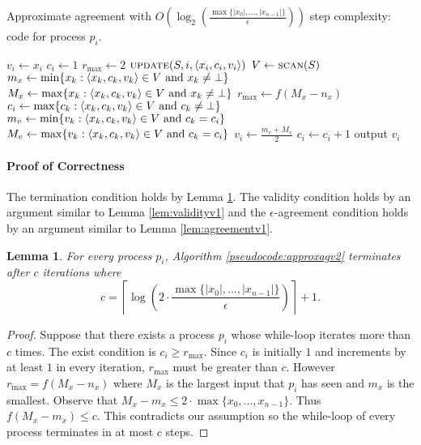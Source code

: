 \documentclass[11pt]{article}
\newcommand\updateF{\textsc{update}}
\newcommand\scanF{\textsc{scan}}
\newtheorem{lemma}[theorem]{Lemma}
\DeclarePairedDelimiter\anglebrac{\langle}{\rangle}
\begin{document}
\begin{algorithm}
	\caption{Approximate agreement with $O\left(\log_2\left(\frac{\max\{|x_0|, ..., |x_{n-1}|\}}{\epsilon}\right)\right)$ step complexity: code for process $p_i$.}
    \label{pseudocode:approxagv2}
    \begin{algorithmic}[1]
	\State $v_i \leftarrow x_i$
	\State $c_i \leftarrow 1$
	\State $r_{\max} \leftarrow 2$
		\State $\updateF(S, i, \anglebrac{x_i, c_i, v_i})$
		\State $V \leftarrow \scanF(S)$
		\State $m_x \leftarrow \min\{x_k: \anglebrac{x_k, c_k, v_k} \in V \mbox{ and } x_k \neq \bot\}$
		\State $M_x \leftarrow \max\{x_k: \anglebrac{x_k, c_k, v_k} \in V \mbox{ and } x_k \neq \bot\}$
		\State $r_{\max} \leftarrow f(M_x-n_x)$
		\State $c_i \leftarrow \max\{c_k: \anglebrac{x_k, c_k, v_k} \in V \mbox{ and } c_k \neq \bot\}$
		\State $m_v \leftarrow \min\{v_k: \anglebrac{x_k, c_k, v_k} \in V \mbox{ and } c_k = c_i\}$
		\State $M_v \leftarrow \max\{v_k: \anglebrac{x_k, c_k, v_k} \in V \mbox{ and } c_k = c_i\}$
		\State $v_i \leftarrow \frac{m_v + M_v}{2}$
		\State $c_i \leftarrow c_i + 1$
	\EndWhile
	\State output $v_i$
	\end{algorithmic}
\end{algorithm}

\paragraph{Proof of Correctness}
The termination condition holds by Lemma \ref{lem:terminationv2}. The validity condition holds by an argument similar to Lemma \ref{lem:validityv1} and the $\epsilon$-agreement condition holds by an argument similar to Lemma \ref{lem:agreementv1}.

\begin{lemma}
\label{lem:terminationv2}
For every process $p_i$, Algorithm \ref{pseudocode:approxagv2} terminates after $c$ iterations where 
\[c = \left\lceil\log\left(2\cdot\frac{\max\{|x_0|, ..., |x_{n-1}|\}}{\epsilon}\right)\right\rceil+1.\] 
\end{lemma}
\begin{proof}
Suppose that there exists a process $p_i$ whose while-loop iterates more than $c$ times. The exist condition is $c_i \geq r_{\max}$. Since $c_i$ is initially $1$ and increments by at least $1$ in every iteration, $r_{\max}$ must be greater than $c$. However $r_{\max} = f(M_x-n_x)$ where $M_x$ is the largest input that $p_i$ has seen and $m_x$ is the smallest. Observe that $M_x - m_x \leq 2\cdot\max\{x_0, ..., x_{n-1}\}$. Thus $f(M_x - m_x) \leq c$. This contradicts our assumption so the while-loop of every process terminates in at most $c$ steps. 
\end{proof}

\end{document}
